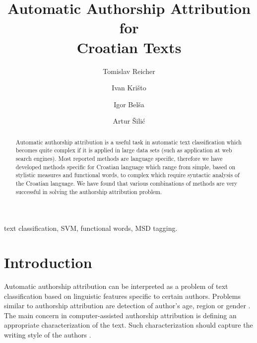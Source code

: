 \documentclass{llncs}
\begin{document}
\title{Automatic Authorship Attribution for\\Croatian Texts}
\author{Tomislav Reicher \and Ivan Krišto \and Igor Belša \and Artur Šilić}

\maketitle


\begin{abstract}
Automatic authorship attribution is a useful task in automatic text
classification which becomes quite complex if it is applied in large data sets
(such as application at web search engines). Most reported methods are language
specific, therefore we have developed methods specific for Croatian language
which range from simple, based on stylistic measures and functional words, to
complex which require syntactic analysis of the Croatian language. We have found
that various combinations of methods are very successful in solving the
authorship attribution problem.
\end{abstract}

text classification, SVM, functional words, MSD tagging.

\section{Introduction}
Automatic authorship attribution can be interpreted as a problem of text
classification based on linguistic features specific to certain authors. Problems similar to authorship
attribution are detection of author's age, region or gender
\cite{luyckx2005shallow}. The main concern in computer-assisted authorship
attribution is defining an appropriate characterization of the text. Such characterization should
capture the writing style of the authors \cite{coyotl2006authorship}.

\end{document}
